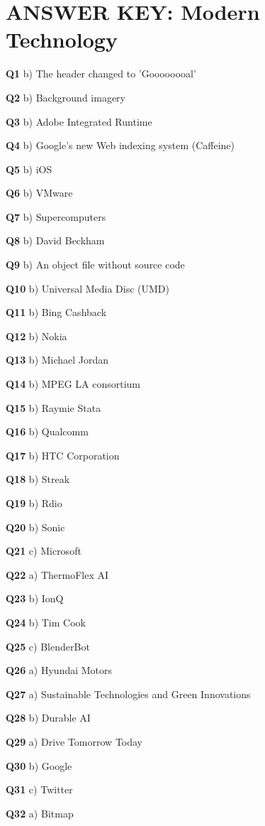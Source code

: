 \section{ANSWER KEY: Modern Technology}

\textbf{Q1} b) The header changed to 'Goooooooal'\par
\textbf{Q2} b) Background imagery\par
\textbf{Q3} b) Adobe Integrated Runtime\par
\textbf{Q4} b) Google's new Web indexing system (Caffeine)\par
\textbf{Q5} b) iOS\par
\textbf{Q6} b) VMware\par
\textbf{Q7} b) Supercomputers\par
\textbf{Q8} b) David Beckham\par
\textbf{Q9} b) An object file without source code\par
\textbf{Q10} b) Universal Media Disc (UMD)\par
\textbf{Q11} b) Bing Cashback\par
\textbf{Q12} b) Nokia\par
\textbf{Q13} b) Michael Jordan\par
\textbf{Q14} b) MPEG LA consortium\par
\textbf{Q15} b) Raymie Stata\par
\textbf{Q16} b) Qualcomm\par
\textbf{Q17} b) HTC Corporation\par
\textbf{Q18} b) Streak\par
\textbf{Q19} b) Rdio\par
\textbf{Q20} b) Sonic\par
\textbf{Q21} c) Microsoft\par
\textbf{Q22} a) ThermoFlex AI\par
\textbf{Q23} b) IonQ\par
\textbf{Q24} b) Tim Cook\par
\textbf{Q25} c) BlenderBot\par
\textbf{Q26} a) Hyundai Motors\par
\textbf{Q27} a) Sustainable Technologies and Green Innovations\par
\textbf{Q28} b) Durable AI\par
\textbf{Q29} a) Drive Tomorrow Today\par
\textbf{Q30} b) Google\par
\textbf{Q31} c) Twitter\par
\textbf{Q32} a) Bitmap\par
